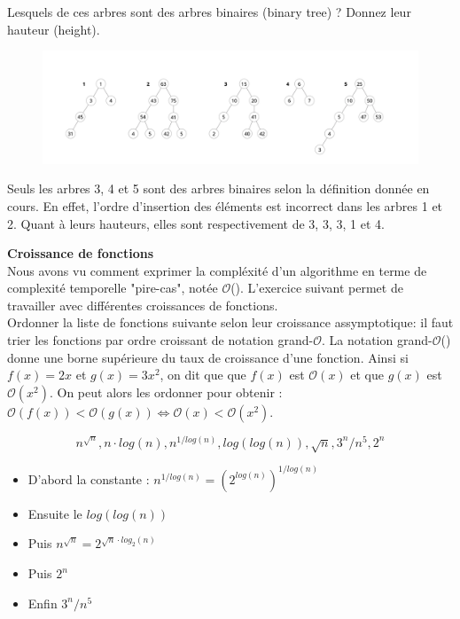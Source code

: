 \begin{Exercice}
	Lesquels de ces arbres sont des arbres binaires (binary tree) ? Donnez leur hauteur (height).
	\begin{figure}[h!]
        		\centering
       	 	\includegraphics[width=18cm]{resources/exercice5.png}
    	\end{figure}
	\begin{solution}
		Seuls les arbres 3, 4 et 5 sont des arbres binaires selon la définition donnée en cours. En effet, l'ordre d'insertion des éléments est incorrect dans les arbres 1 et 2. 
		Quant à leurs hauteurs, elles sont respectivement de 3, 3, 3, 1 et 4.
	\end{solution}
\end{Exercice}


\begin{Exercice}[10 minutes]\textbf{Croissance de fonctions}\\
Nous avons vu comment exprimer la compléxité d'un algorithme en terme de complexité temporelle "pire-cas", notée $\mathcal{O}$(). L'exercice suivant permet de travailler avec différentes croissances de fonctions.\\ Ordonner la liste de fonctions suivante selon leur croissance assymptotique: il faut trier les fonctions par ordre croissant de notation grand-$\mathcal{O}$. La notation grand-$\mathcal{O}$() donne une borne supérieure du taux de croissance d'une fonction. Ainsi si $f(x) = 2x$ et $g(x) = 3x^2$, on dit que que $f(x)$ est $\mathcal{O}(x)$ et que $g(x)$ est $\mathcal{O}(x^2)$. On peut alors les ordonner pour obtenir : $\mathcal{O}(f(x)) < \mathcal{O}(g(x)) \Leftrightarrow \mathcal{O}(x) < \mathcal{O}(x^2)$.

	\begin{equation}
		n^{\sqrt{n}}, n\cdot log(n), n^{1/log(n)}, log(log(n)), \sqrt{n}, 3^{n}/{n^5}, 2^n
	\end{equation}
	
	\begin{solution}
		\begin{itemize}
			\item D'abord la constante : $n^{1/log(n)} = (2^{log(n)})^{1/log(n)}$
			\item Ensuite le $log(log(n))$
			\item Puis $n^{\sqrt{n}} = 2^{\sqrt{n}\cdot log_2(n)}$
			\item Puis $2^n$
			\item Enfin  $3^{n}/{n^5}$
		\end{itemize}
	\end{solution}
\end{Exercice}


